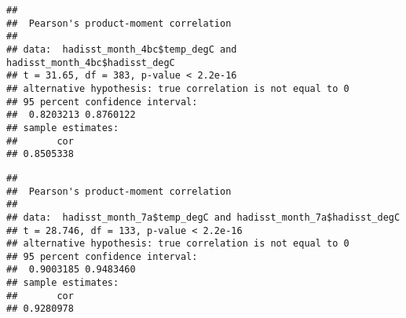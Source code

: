 \documentclass[
]{article}
\newenvironment{Shaded}{\begin{snugshade}}{\end{snugshade}}
\newcommand{\CommentTok}[1]{\textcolor[rgb]{0.56,0.35,0.01}{\textit{#1}}}
\newcommand{\FunctionTok}[1]{\textcolor[rgb]{0.00,0.00,0.00}{#1}}
\newcommand{\NormalTok}[1]{#1}
\newcommand{\OtherTok}[1]{\textcolor[rgb]{0.56,0.35,0.01}{#1}}
\newcommand{\SpecialCharTok}[1]{\textcolor[rgb]{0.00,0.00,0.00}{#1}}
\newcommand{\StringTok}[1]{\textcolor[rgb]{0.31,0.60,0.02}{#1}}
\begin{document}
\begin{Shaded}
\end{Shaded}

\begin{verbatim}
## 
##  Pearson's product-moment correlation
## 
## data:  hadisst_month_4bc$temp_degC and hadisst_month_4bc$hadisst_degC
## t = 31.65, df = 383, p-value < 2.2e-16
## alternative hypothesis: true correlation is not equal to 0
## 95 percent confidence interval:
##  0.8203213 0.8760122
## sample estimates:
##       cor 
## 0.8505338
\end{verbatim}

\begin{Shaded}
\end{Shaded}

\begin{verbatim}
## 
##  Pearson's product-moment correlation
## 
## data:  hadisst_month_7a$temp_degC and hadisst_month_7a$hadisst_degC
## t = 28.746, df = 133, p-value < 2.2e-16
## alternative hypothesis: true correlation is not equal to 0
## 95 percent confidence interval:
##  0.9003185 0.9483460
## sample estimates:
##       cor 
## 0.9280978
\end{verbatim}
\end{document}
